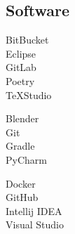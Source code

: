 \documentclass[curriculum-vitae-eng]{subfiles}
\begin{document}
		\subsection*{Software}
			\begin{minipage}[t]{.3\textwidth}
				BitBucket \hfill {}\\
				Eclipse \hfill {}\\
				GitLab \hfill {}\\
				Poetry \hfill {}\\
				\TeX Studio \hfill {}\\
			\end{minipage}
			\hfill
			\begin{minipage}[t]{.3\textwidth}
				Blender \hfill {}\\
				Git \hfill {}\\
				Gradle \hfill {}\\
				PyCharm \hfill {}\\
			\end{minipage}
			\hfill
			\begin{minipage}[t]{.3\textwidth}
				Docker \hfill {}\\
				GitHub \hfill {}\\
				Intellij IDEA \hfill {}\\
				Visual Studio \hfill {}\\
			\end{minipage}
		
\end{document}

